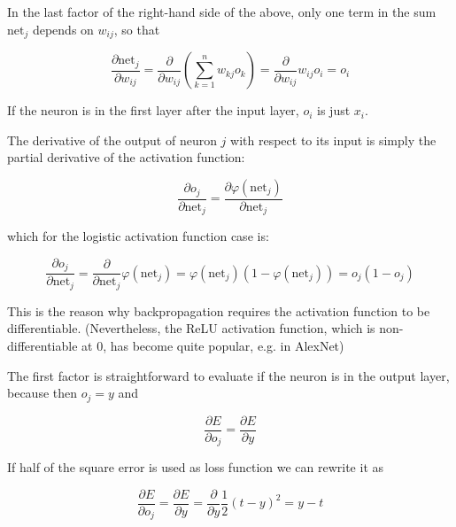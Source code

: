 In the last factor of the right-hand side of the above, only one term in the sum ${\text{net}}_{j}$ depends on $w_{ij}$, so that

\begin{equation}
    \label{eq:chain-2}
    {\frac {\partial {\text{net}}_{j}}{\partial w_{ij}}}={\frac {\partial }{\partial w_{ij}}}\left(\sum _{k=1}^{n}w_{kj}o_{k}\right)={\frac {\partial }{\partial w_{ij}}}w_{ij}o_{i}=o_{i}
\end{equation}

If the neuron is in the first layer after the input layer, $o_{i}$ is just $x_{i}$.

The derivative of the output of neuron $j$ with respect to its input is simply the partial derivative of the activation function:

\begin{equation}
    \label{eq:chain-3}
    {\frac {\partial o_{j}}{\partial {\text{net}}_{j}}}={\frac {\partial \varphi ({\text{net}}_{j})}{\partial {\text{net}}_{j}}}
\end{equation}

which for the logistic activation function case is:

\begin{equation}
    \label{eq:chain-4}
    {\frac {\partial o_{j}}{\partial {\text{net}}_{j}}}={\frac {\partial }{\partial {\text{net}}_{j}}}\varphi ({\text{net}}_{j})=\varphi ({\text{net}}_{j})(1-\varphi ({\text{net}}_{j}))=o_{j}(1-o_{j})
\end{equation}

This is the reason why backpropagation requires the activation function to be differentiable. (Nevertheless, the ReLU activation function, which is non-differentiable at 0, has become quite popular, e.g. in AlexNet)

The first factor is straightforward to evaluate if the neuron is in the output layer, because then $o_j = y$ and

\begin{equation}
    \label{eq:chain-5}
    {\frac {\partial E}{\partial o_{j}}}={\frac {\partial E}{\partial y}}
\end{equation}

If half of the square error is used as loss function we can rewrite it as

\begin{equation}
    \label{eq:chain-6}
    {\frac {\partial E}{\partial o_{j}}}={\frac {\partial E}{\partial y}}={\frac {\partial }{\partial y}}{\frac {1}{2}}(t-y)^{2}=y-t
\end{equation}

